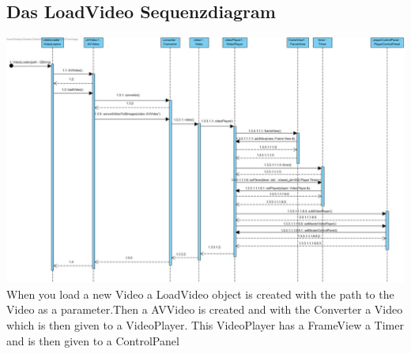 \documentclass[twoside]{book}
\newcommand{\+}{\discretionary{\mbox{\scriptsize$\hookleftarrow$}}{}{}}
\begin{document}
\subsection*{Das LoadVideo Sequenzdiagram}
{\centering\includegraphics[width=1\textwidth]{SequenceDiagram1.jpg}}\\
When you load a new Video a LoadVideo object is created with the path to the Video as a parameter.Then a AVVideo is created and with the Converter a Video which is then given to a VideoPlayer. This VideoPlayer has a FrameView a Timer and is then given to a ControlPanel
\newpage
\end{document}
